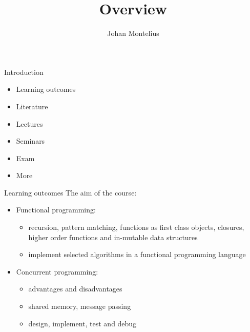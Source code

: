 

\title[ID1019 Overview]{Overview}


\author{Johan Montelius}
\date{\semester}



\begin{frame}
\titlepage
\end{frame}


\begin{frame}{Introduction}
  \begin{itemize}
    \pause \item Learning outcomes
    \pause \item Literature
    \pause \item Lectures
    \pause \item Seminars
    \pause \item Exam
    \pause \item More
  \end{itemize}
\end{frame}


\begin{frame}{Learning outcomes}
  The aim of the course:

\pause
\begin{itemize}
\item Functional programming:
\pause
  \begin{itemize}
   \item recursion, pattern matching, functions as first class objects, closures, higher order functions and in-mutable data structures
\pause
   \item implement selected algorithms in a functional programming language
  \end{itemize}
\pause
\item Concurrent programming:
  \begin{itemize}
\pause
    \item advantages and disadvantages
\pause
    \item shared memory, message passing
\pause
    \item design, implement, test and debug 
  \end{itemize}  
\end{itemize}

\end{frame}


